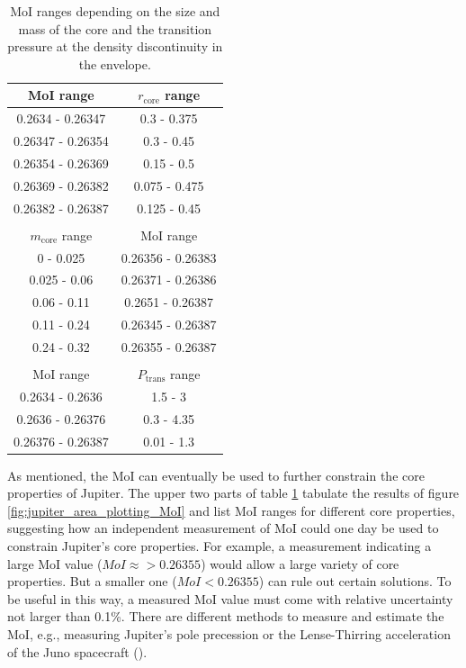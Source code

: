 \documentclass[usenatbib]{mnras}
\newcommand{\sub}[1]{_{\text{#1}}}
\begin{document}
\begin{table}
\caption{MoI ranges depending on the size and mass of the core and the transition pressure at the density discontinuity in the envelope.}
\centering
 \begin{tabular}{c|c}
  MoI range & $r\sub{core}$ range \\
 \hline
0.2634 - 0.26347 & 0.3 - 0.375  \\
0.26347 - 0.26354 & 0.3 - 0.45  \\
0.26354 - 0.26369 & 0.15 - 0.5  \\
0.26369 - 0.26382 & 0.075 - 0.475  \\
0.26382 - 0.26387 & 0.125 - 0.45  \\
\\
$m\sub{core}$ range & MoI range \\
 \hline
0 - 0.025 & 0.26356 - 0.26383 \\
0.025 - 0.06 & 0.26371 - 0.26386 \\
0.06 - 0.11 & 0.2651 - 0.26387 \\
0.11 - 0.24 & 0.26345 - 0.26387 \\
0.24 - 0.32 & 0.26355 - 0.26387 \\
\\
MoI range & $P\sub{trans}$ range \\
 \hline
0.2634 - 0.2636 & 1.5 - 3 \\
0.2636 - 0.26376 & 0.3 - 4.35 \\
0.26376 - 0.26387 & 0.01 - 1.3 \\
 \end{tabular}
\label{tab:MoI:ranges}
\end{table}
As mentioned, the MoI can eventually be used to further constrain the core properties of Jupiter. The upper two parts of table \ref{tab:MoI:ranges} tabulate the results of figure \ref{fig:jupiter_area_plotting_MoI} and list MoI ranges for different core properties, suggesting how an independent measurement of MoI could one day be used to constrain Jupiter's core properties. For example,  
a measurement indicating a large MoI value ($MoI \approx > 0.26355$) would allow a large variety of core properties. But a smaller one ($MoI < 0.26355$) can rule out certain solutions.
To be useful in this way, a measured MoI value must come with relative uncertainty not larger than 0.1\%.
There are different methods to measure and estimate the MoI, e.g., measuring Jupiter's pole precession or the Lense-Thirring acceleration of the Juno spacecraft (\cite{HELLED2011440}).
\end{document}
